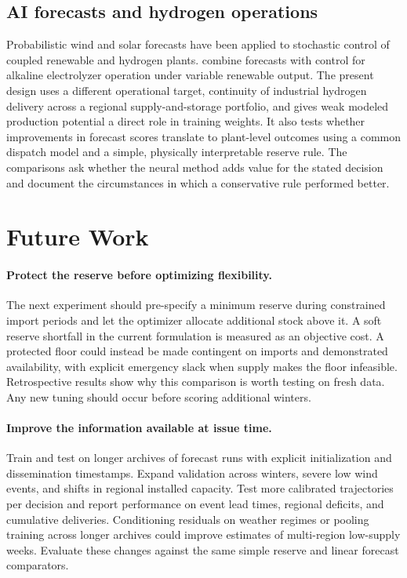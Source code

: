 \documentclass[10pt,a4paper,twocolumn]{article}
\begin{document}
\subsection{AI forecasts and hydrogen operations}
Probabilistic wind and solar forecasts have been applied to stochastic control of coupled renewable and hydrogen plants. \citet{zhao2026} combine forecasts with control for alkaline electrolyzer operation under variable renewable output. The present design uses a different operational target, continuity of industrial hydrogen delivery across a regional supply-and-storage portfolio, and gives weak modeled production potential a direct role in training weights. It also tests whether improvements in forecast scores translate to plant-level outcomes using a common dispatch model and a simple, physically interpretable reserve rule. The comparisons ask whether the neural method adds value for the stated decision and document the circumstances in which a conservative rule performed better.





\section{Future Work}
\paragraph{Protect the reserve before optimizing flexibility.}
The next experiment should pre-specify a minimum reserve during constrained import periods and let the optimizer allocate additional stock above it. A soft reserve shortfall in the current formulation is measured as an objective cost. A protected floor could instead be made contingent on imports and demonstrated availability, with explicit emergency slack when supply makes the floor infeasible. Retrospective results show why this comparison is worth testing on fresh data. Any new tuning should occur before scoring additional winters.

\paragraph{Improve the information available at issue time.}
Train and test on longer archives of forecast runs with explicit initialization and dissemination timestamps. Expand validation across winters, severe low wind events, and shifts in regional installed capacity. Test more calibrated trajectories per decision and report performance on event lead times, regional deficits, and cumulative deliveries. Conditioning residuals on weather regimes or pooling training across longer archives could improve estimates of multi-region low-supply weeks. Evaluate these changes against the same simple reserve and linear forecast comparators.
\end{document}
